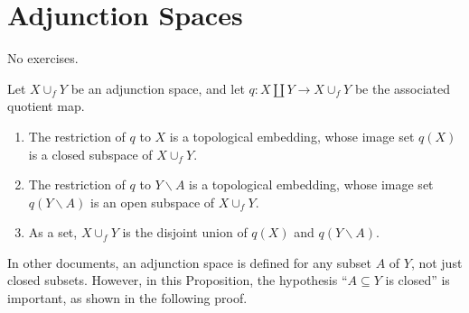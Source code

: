 \section*{Adjunction Spaces}

No exercises.

\begin{prop}{3.77}\label{prop:3.77}
    Let $X \cup_{f} Y$ be an adjunction space, and let $q: X \amalg Y \to X \cup_{f} Y$ be the associated quotient map.
    \begin{enumerate}[label={(\alph*)}]
        \item The restriction of $q$ to $X$ is a topological embedding, whose image set $q(X)$ is a closed subspace of $X \cup_{f} Y$.
        \item The restriction of $q$ to $Y\smallsetminus A$ is a topological embedding, whose image set $q(Y\smallsetminus A)$ is an open subspace of $X \cup_{f} Y$.
        \item As a set, $X \cup_{f} Y$ is the disjoint union of $q(X)$ and $q(Y\smallsetminus A)$.
    \end{enumerate}
\end{prop}

\begin{note}
    In other documents, an adjunction space is defined for any subset $A$ of $Y$, not just closed subsets. However, in this Proposition, the hypothesis ``$A\subseteq Y$ is closed'' is important, as shown in the following proof.
\end{note}

